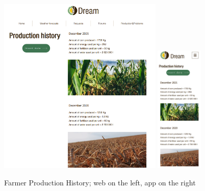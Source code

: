 \documentclass{article}
\begin{document}
        \begin{figure} [h]
            \centering
            \includegraphics[width=0.7\textwidth]{images/UserInterfaces/Farmer/ProductionAndProblems/ProductionHistoryWeb.png}
            \quad
            \includegraphics[width=0.2\textwidth]{images/UserInterfaces/Farmer/ProductionAndProblems/ProductionHistoryApp.png}
            \quad
            \caption{\label{fig:farmerProductionHistory}Farmer Production History; web on the left, app on the right}
        \end{figure}
        \newpage
\end{document}

